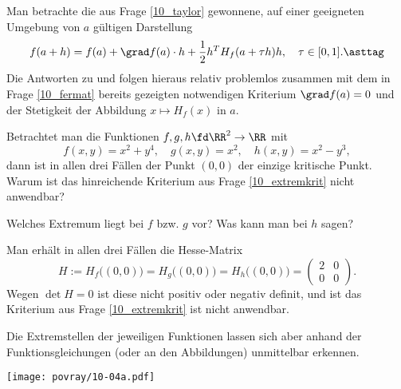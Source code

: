\begin{antwort}
  Man betrachte die aus Frage \ref{10_taylor} 
  gewonnene, auf einer geeigneten Umgebung von $a$ gültigen Darstellung 
  \begin{equation}
    f(a+h)=f(a)+\grad f(a)\cdot h + \frac{1}{2} h^T H_f(a+\tau h) h, \quad 
    \tau \in [0,1].
    \asttag
  \end{equation}
  Die Antworten zu  und  
  folgen hieraus relativ problemlos 
  zusammen mit dem in Frage \ref{10_fermat} bereits 
  gezeigten notwendigen Kriterium $\grad f(a)=0$  
  und der Stetigkeit der Abbildung 
  $x\mapsto H_f(x)$ in $a$. \AntEnd
\end{antwort}

\begin{frage}
  Betrachtet man die Funktionen $f,g,h \fd \RR^2 \to \RR$ mit 
  \[
  f(x,y)=x^2+y^4, \quad g(x,y)=x^2, \quad h(x,y)=x^2-y^3,
  \]
  dann ist in allen drei Fällen der Punkt $(0,0)$ der einzige 
  kritische Punkt. Warum ist das hinreichende Kriterium aus 
  Frage \ref{10_extremkrit} nicht anwendbar?

  Welches Extremum liegt bei $f$ bzw. $g$ vor? Was kann man bei $h$ 
  sagen?
\end{frage}



\begin{antwort}
  Man erhält in allen drei Fällen die Hesse-Matrix 
  \[
  H := H_f \big( (0,0) \big) = H_g \big( (0,0) \big) = H_h \big( (0,0) \big)
  =\begin{pmatrix} 2 & 0 \\ 0 & 0 \end{pmatrix}.
  \]
  Wegen $\det H=0$ ist diese nicht positiv oder negativ definit, und 
  ist das Kriterium aus Frage \ref{10_extremkrit} ist nicht anwendbar. 

  Die Extremstellen der jeweiligen 
  Funktionen lassen sich aber anhand der 
  Funktionsgleichungen (oder an den Abbildungen) unmittelbar erkennen.  

  \vspace*{-4mm}

  \begin{center}
    \texttt{[image: povray/10-04a.pdf]}
  \end{center}

  \vspace*{-4mm}
\end{antwort}

